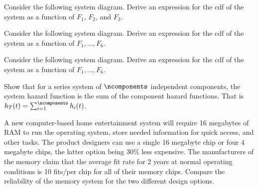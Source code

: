 \begin{exercise}
Consider the following system diagram. Derive an expression for the
cdf of the system as a function of $F_{1}$, $F_{2}$, and $F_{3}$.\\
\end{exercise}

\begin{exercise}
Consider the following system diagram. Derive an expression for the
cdf of the system as a function of $F_{1}, \dots, F_{6}$.\\
\end{exercise}

\begin{exercise}
Consider the following system diagram. Derive an expression for the
cdf of the system as a function of $F_{1}, \dots, F_{6}$.\\
\end{exercise}

\begin{exercise1}
Show that for a series system of $\ncomponents$ independent
components, the system hazard function is the sum of the component
hazard functions.  That is $h_{T}(t) = \sum_{i=1}^{\ncomponents}
h_{i}(t)$.
\end{exercise1}

\begin{exercise}
\label{exercise:ram.option}
A new computer-based home entertainment system will require 16
megabytes of RAM to run the operating system, store needed information
for quick access, and other tasks.  The product designers can use a
single 16 megabyte chip or four 4 megabyte chips, the latter option
being 30\% less expensive. The manufacturers of the memory claim that
the average fit rate for 2 years at normal operating conditions is 10
fits/per chip for all of their memory chips. Compare the reliability
of the memory system for the two different design options.
\end{exercise}

